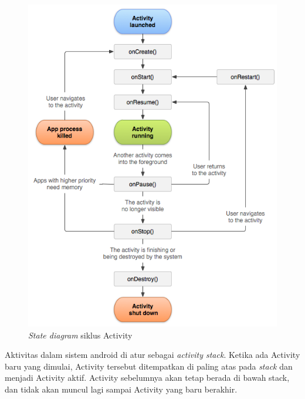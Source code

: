 \begin{figure}[htbp]
	\centering
		\includegraphics[scale=0.48]{Gambar/activity-lifecycle.png}
	\caption{\textit{State diagram} siklus Activity}
	\label{fig:activity-lifecycle}
\end{figure}

Aktivitas dalam sistem android di atur sebagai \textit{activity stack}. Ketika ada Activity baru yang dimulai, Activity tersebut ditempatkan di paling atas pada \textit{stack} dan menjadi Activity aktif. Activity sebelumnya akan tetap berada di bawah stack, dan tidak akan muncul lagi sampai Activity yang baru berakhir. 

